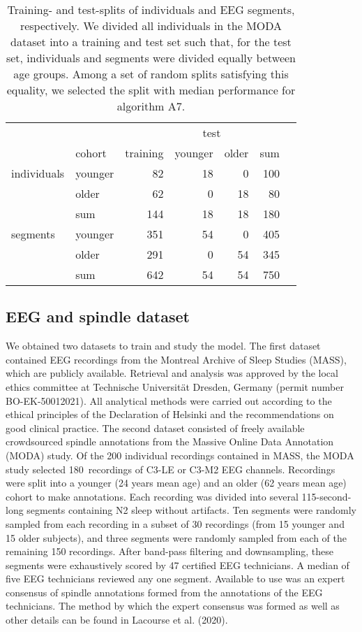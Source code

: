 \documentclass[fleqn,twocolumn,10pt]{wlscirep}
\begin{document}
\begin{table}
	\centering
	
	\begin{tabular}{@{}llrrrrr@{}}
	\toprule
	& & & \multicolumn{2}{c}{test} & \\
	\cmidrule(l){4-5}
	& cohort & training & younger & older & sum \\
	\midrule
	individuals & younger & 82 & 18 & 0 & 100 \\
	& older & 62 & 0 & 18 & 80 \\
	& sum & 144 & 18 & 18 & 180 \\
	\midrule
	segments & younger & 351 & 54 & 0 & 405 \\
	& older & 291 & 0 & 54 & 345 \\
	& sum & 642 & 54 & 54 & 750 \\
	\bottomrule
	\end{tabular}
	\caption{
	Training- and test-splits of individuals and EEG segments, respectively.
We divided all individuals in the MODA dataset into a training and test set
	such that, for the test set, individuals and segments were divided equally between age groups.
	Among a set of random splits satisfying this equality, we selected the split with
	median performance for algorithm A7.
\label{tab:data:splits}
	}
\end{table}
	
\subsection{EEG and spindle dataset}

We obtained two datasets to train and study the model. 
The first dataset contained EEG recordings from
the Montreal Archive of Sleep Studies (MASS)\cite{OReilly2014},
which are publicly available\cite{MASS2020}.
Retrieval and analysis was approved by the local ethics committee 
at Technische Universität Dresden, Germany (permit number BO-EK-50012021).
All analytical methods were carried out according to the ethical principles of the Declaration of Helsinki\cite{WMA2001} and the recommendations on good clinical practice\cite{EMA2021}.
The second dataset consisted of freely available crowdsourced spindle annotations from the Massive Online Data Annotation
(MODA) study\cite{Lacourse2020}.  Of the 200 individual recordings
contained in MASS, the MODA study selected 180~recordings of C3-LE or C3-M2 EEG channels.
Recordings were split
into a younger (24 years mean age) and an older (62 years mean age) cohort
to make annotations.
Each recording was divided into several 115-second-long segments containing N2
sleep without artifacts.  Ten segments were 
randomly sampled from each recording in a subset of 30
recordings (from 15 younger and 15 older subjects), and three segments were 
randomly sampled 
from each of the
remaining 150 recordings.
After band-pass filtering and downsampling, these segments were exhaustively scored by 
47 certified EEG technicians.
A median of five EEG technicians reviewed any one segment.
Available to use was an expert consensus of spindle annotations formed from the
annotations of the EEG technicians.
The method by which the expert consensus was formed as well
as other details can be found in Lacourse et al. (2020)\cite{Lacourse2020}.
\end{document}
